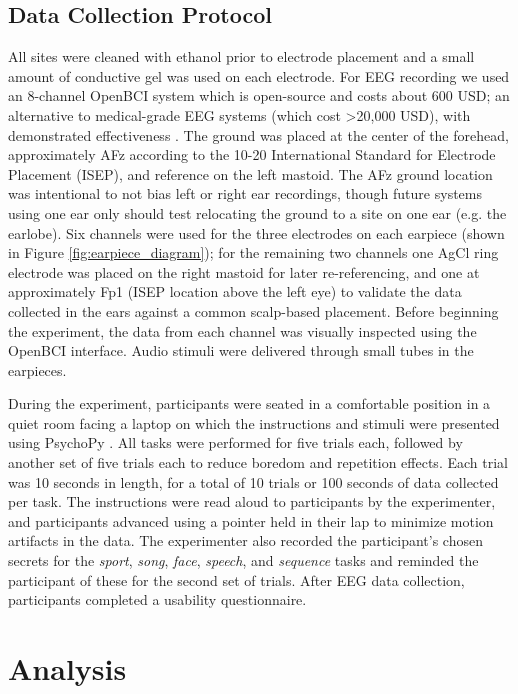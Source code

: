 \documentclass{sigchi}
\begin{document}
\subsection{Data Collection Protocol}
All sites were cleaned with ethanol prior to electrode placement and a small amount of conductive gel was used on each electrode. For EEG recording we used an 8-channel OpenBCI system \cite{michalska2009openbci} which is open-source and costs about 600 USD; an alternative to medical-grade EEG systems (which cost \textgreater20,000 USD), with demonstrated effectiveness \cite{Frey2016}. The ground was placed at the center of the forehead, approximately AFz according to the 10-20 International Standard for Electrode Placement (ISEP), and reference on the left mastoid. The AFz ground location was intentional to not bias left or right ear recordings, though future systems using one ear only should test relocating the ground to a site on one ear (e.g. the earlobe). Six channels were used for the three electrodes on each earpiece (shown in Figure \ref{fig:earpiece_diagram}); for the remaining two channels one AgCl ring electrode was placed on the right mastoid for later re-referencing, and one at approximately Fp1 (ISEP location above the left eye) to validate the data collected in the ears against a common scalp-based placement. Before beginning the experiment, the data from each channel was visually inspected using the OpenBCI interface. Audio stimuli were delivered through small tubes in the earpieces.

During the experiment, participants were seated in a comfortable position in a quiet room facing a laptop on which the instructions and stimuli were presented using PsychoPy \cite{peirce2007psychopy}. All tasks were performed for five trials each, followed by another set of five trials each to reduce boredom and repetition effects. Each trial was 10 seconds in length, for a total of 10 trials or 100 seconds of data collected per task. The instructions were read aloud to participants by the experimenter, and participants advanced using a pointer held in their lap to minimize motion artifacts in the data. The experimenter also recorded the participant's chosen secrets for the \textit{sport}, \textit{song}, \textit{face}, \textit{speech}, and \textit{sequence} tasks and reminded the participant of these for the second set of trials. After EEG data collection, participants completed a usability questionnaire.

\section{Analysis}
\end{document}
